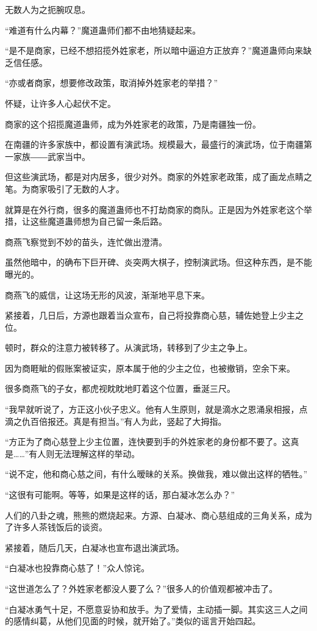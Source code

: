 \begin{this_body}
无数人为之扼腕叹息。

“难道有什么内幕？”魔道蛊师们都不由地猜疑起来。

“是不是商家，已经不想招揽外姓家老，所以暗中逼迫方正放弃？”魔道蛊师向来缺乏信任感。

“亦或者商家，想要修改政策，取消掉外姓家老的举措？”

怀疑，让许多人心起伏不定。

商家的这个招揽魔道蛊师，成为外姓家老的政策，乃是南疆独一份。

在南疆的许多家族中，都设置有演武场。规模最大，最盛行的演武场，位于南疆第一家族――武家当中。

但这些演武场，都是对内居多，很少对外。商家的外姓家老政策，成了画龙点睛之笔。为商家吸引了无数的人才。

就算是在外行商，很多的魔道蛊师也不打劫商家的商队。正是因为外姓家老这个举措，让这些魔道蛊师想为自己留一条后路。

商燕飞察觉到不妙的苗头，连忙做出澄清。

虽然他暗中，的确布下巨开碑、炎突两大棋子，控制演武场。但这种东西，是不能曝光的。

商燕飞的威信，让这场无形的风波，渐渐地平息下来。

紧接着，几日后，方源也跟着当众宣布，自己将投靠商心慈，辅佐她登上少主之位。

顿时，群众的注意力被转移了。从演武场，转移到了少主之争上。

因为商睚眦的假账案被证实，原本属于他的少主之位，也被撤销，空余下来。

很多商燕飞的子女，都虎视眈眈地盯着这个位置，垂涎三尺。

“我早就听说了，方正这小伙子忠义。他有人生原则，就是滴水之恩涌泉相报，点滴之仇百倍报还。真是有担当。”有人为此，竖起了大拇指。

“方正为了商心慈登上少主位置，连快要到手的外姓家老的身份都不要了。这真是……”有人则无法理解这样的举动。

“说不定，他和商心慈之间，有什么暧昧的关系。换做我，难以做出这样的牺牲。”

“这很有可能啊。等等，如果是这样的话，那白凝冰怎么办？”

人们的八卦之魂，熊熊的燃烧起来。方源、白凝冰、商心慈组成的三角关系，成为了许多人茶钱饭后的谈资。

紧接着，随后几天，白凝冰也宣布退出演武场。

“白凝冰也投靠商心慈了！”众人惊诧。

“这世道怎么了？外姓家老都没人要了么？”很多人的价值观都被冲击了。

“白凝冰勇气十足，不愿意妥协和放手。为了爱情，主动插一脚。其实这三人之间的感情纠葛，从他们见面的时候，就开始了。”类似的谣言开始四起。


\end{this_body}
